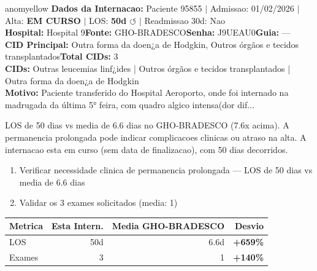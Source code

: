 \documentclass[a4paper,10pt]{article}
\begin{document}
\begin{anomalycard}[Internacao 115294 | GHO-BRADESCO | MODERADO (z=2.78)]{anomyellow}
\textbf{Dados da Internacao:} Paciente 95855 $\mid$ Admissao: 01/02/2026 $\mid$ Alta: \textcolor{anomorange}{\textbf{EM CURSO}} $\mid$ LOS: \textbf{50d \textcolor{anomorange}{$\circlearrowleft$}} $\mid$ Readmissao 30d: Nao\\
\textbf{Hospital:} Hospital 9\quad\textbf{Fonte:} GHO-BRADESCO\quad\textbf{Senha:} J9UEAU0\quad\textbf{Guia:} ---\\
\textbf{CID Principal:} {\small Outra forma da doen¿a de Hodgkin, Outros órgãos e tecidos transplantados}\quad\textbf{Total CIDs:} 3\\

\textbf{CIDs:} {\scriptsize Outras leucemias linf¿ides | Outros órgãos e tecidos transplantados | Outra forma da doen¿a de Hodgkin}\\

\textbf{Motivo:} {\scriptsize Paciente transferido do Hospital  Aeroporto, onde foi internado na madrugada da última 5° feira, com quadro algico intensa(dor dif...}\\

\vspace{2pt}\begin{tcolorbox}[colback=severityred!20,colframe=anomyellow,title={\textbf{Interpretacao de Negocio}},fonttitle=\bfseries\small,left=4pt,right=4pt,top=3pt,bottom=3pt]
{\small LOS de 50 dias vs media de 6.6 dias no GHO-BRADESCO (7.6x acima). A permanencia prolongada pode indicar complicacoes clinicas ou atraso na alta. A internacao esta em curso (sem data de finalizacao), com 50 dias decorridos.}
\end{tcolorbox}
\begin{tcolorbox}[colback=severityyellow!30,colframe=anomorange,title={\textbf{Recomendacoes Especificas}},fonttitle=\bfseries\small,left=4pt,right=4pt,top=3pt,bottom=3pt]
\begin{enumerate}[nosep,leftmargin=16pt]
\item {\small Verificar necessidade clinica de permanencia prolongada --- LOS de 50 dias vs media de 6.6 dias}
\item {\small Validar os 3 exames solicitados (media: 1)}
\end{enumerate}
\end{tcolorbox}
\begin{center}\begin{tabular}{l r r r}\toprule\textbf{Metrica} & \textbf{Esta Intern.} & \textbf{Media GHO-BRADESCO} & \textbf{Desvio} \\\midrule
LOS & 50d & 6.6d & \textcolor{anomred}{\textbf{+659\%}} \\
Exames & 3 & 1 & \textcolor{anomred}{\textbf{+140\%}} \\
\bottomrule\end{tabular}\end{center}


\end{anomalycard}
\end{document}
